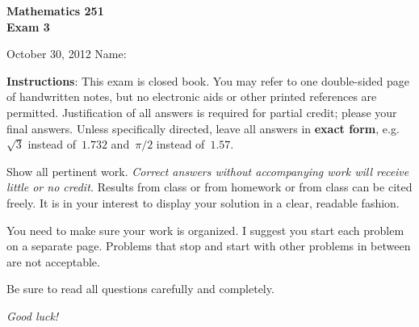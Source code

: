 \documentclass[11pt]{exam}
\begin{document}
\addpoints

\noindent
\textbf{{\large Mathematics 251 \\ Exam 3}}

\noindent
October 30, 2012  \hfill Name: \underline{\hspace{3in}}


\noindent
\textbf{Instructions}: This exam is closed book. You may refer to one double-sided page of handwritten notes, but no electronic aids or other printed references are permitted. Justification of all answers is required for partial credit; please  your final answers. Unless specifically directed, leave all answers in \textbf{exact form}, e.g.\ $\sqrt{3}$ instead of~$1.732$ and~$\pi/2$ instead of~$1.57$.

Show all pertinent work. \emph{Correct answers without accompanying work will receive little or no credit.} Results from class or from homework or from class can be cited freely. It is in your interest to display your solution in a clear, readable fashion.

You need to make sure your work is organized. I suggest you start each problem on a separate page. Problems that stop and start with other problems in between are not acceptable.


Be sure to read all questions carefully and completely.

\vspace*{2in}

\begin{center}
\combinedgradetable[h]
\end{center}

\vspace*{0.5in}

\begin{center}
{\Large \emph{Good luck!}}
\end{center}

\newpage
\end{document}
